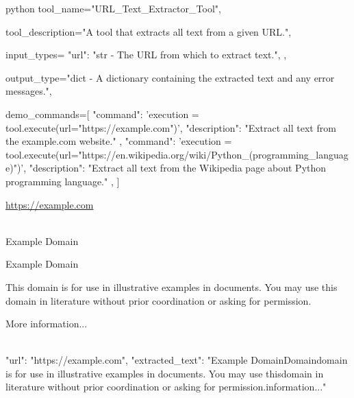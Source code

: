 \begin{codecolorbox}{python}
tool_name="URL_Text_Extractor_Tool",

tool_description="A tool that extracts all text from a given URL.",

input_types={
    "url": "str - The URL from which to extract text.",
},

output_type="dict - A dictionary containing the extracted text and any error messages.",

demo_commands=[
    {
        "command": 'execution = tool.execute(url="https://example.com")',
        "description": "Extract all text from the example.com website."
    },
    {
        "command": 'execution = tool.execute(url="https://en.wikipedia.org/wiki/Python_(programming_language)")',
        "description": "Extract all text from the Wikipedia page about Python programming language."
    },
]
\end{codecolorbox}


\begin{textcolorbox}
\url{https://example.com}
\\\\

Example Domain

Example Domain

This domain is for use in illustrative examples in documents. You may use this
    domain in literature without prior coordination or asking for permission.
    
More information...
\\\\
\begin{codebox}
{
    "url": "https://example.com",
    "extracted_text": "Example Domain\nExample Domain\nThis domain is for use in illustrative examples in documents. You may use this\n    domain in literature without prior coordination or asking for permission.\nMore information..."
}
\end{codebox}

\end{textcolorbox}


